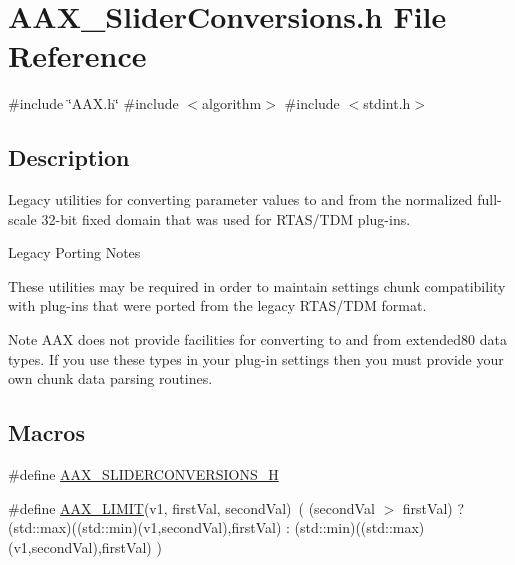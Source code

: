 \hypertarget{a00674}{}\section{A\+A\+X\+\_\+\+Slider\+Conversions.\+h File Reference}
\label{a00674}
{\ttfamily \#include \char`\"{}A\+A\+X.\+h\char`\"{}}\newline
{\ttfamily \#include $<$algorithm$>$}\newline
{\ttfamily \#include $<$stdint.\+h$>$}\newline


\subsection{Description}
Legacy utilities for converting parameter values to and from the normalized full-\/scale 32-\/bit fixed domain that was used for R\+T\+A\+S/\+T\+DM plug-\/ins. 

\begin{DoxyRefDesc}{Legacy Porting Notes}
\item[\mbox{\hyperlink{a00787__porting_notes000059}{Legacy Porting Notes}}]These utilities may be required in order to maintain settings chunk compatibility with plug-\/ins that were ported from the legacy R\+T\+A\+S/\+T\+DM format.\end{DoxyRefDesc}


\begin{DoxyNote}{Note}
A\+AX does not provide facilities for converting to and from extended80 data types. If you use these types in your plug-\/in settings then you must provide your own chunk data parsing routines. 
\end{DoxyNote}
\subsection*{Macros}
\begin{DoxyCompactItemize}
\item 
\#define \mbox{\hyperlink{a00674_a8676d067980b7fb9a1f53cfa5dbc048a}{A\+A\+X\+\_\+\+S\+L\+I\+D\+E\+R\+C\+O\+N\+V\+E\+R\+S\+I\+O\+N\+S\+\_\+H}}
\item 
\#define \mbox{\hyperlink{a00674_af5bd671969b131ba73e1651befa4f51f}{A\+A\+X\+\_\+\+L\+I\+M\+IT}}(v1,  first\+Val,  second\+Val)~( (second\+Val $>$ first\+Val) ? (std\+::max)((std\+::min)(v1,second\+Val),first\+Val) \+:  (std\+::min)((std\+::max)(v1,second\+Val),first\+Val) )
\end{DoxyCompactItemize}
